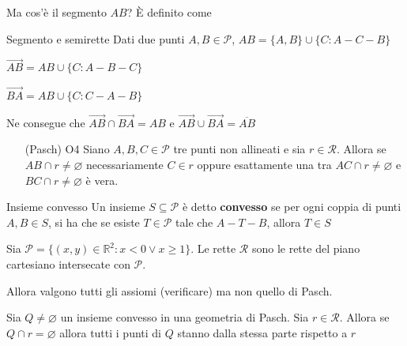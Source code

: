 Ma cos'è il segmento \(AB\)? È definito come 
\begin{definition}{Segmento e semirette}
    Dati due punti \(A, B \in \mathcal{P}\), 
    \(AB = \{A, B\} \cup \{C : A - C - B\} \)  

    \(\vec{AB} = AB \cup \{C : A - B - C\} \) 

    \(\vec{BA} = AB \cup \{C : C - A - B\} \) 
\end{definition}

Ne consegue che \(\vec{AB} \cap \vec{BA} = AB\) e \(\vec{AB} \cup \vec{BA} =
\overline{AB}\) 
\begin{enumerate}
    \item[(Pasch) O4] Siano \(A, B, C \in \mathcal{P}\) tre punti non allineati
        e sia \(r \in \mathcal{R}\). Allora se \(AB \cap r \neq \varnothing\)
        necessariamente \(C \in r\) oppure esattamente una tra  \(AC \cap r \neq
        \varnothing\) e \(BC \cap r \neq \varnothing\) è vera.
\end{enumerate}



\begin{definition}{Insieme convesso}
    Un insieme \(S \subseteq \mathcal{P}\) è detto \textbf{convesso} se per ogni
    coppia di punti \(A, B \in S\), si ha che se esiste \(T \in \mathcal{P}\)
    tale che \(A - T - B\), allora \(T \in S\) 
\end{definition}

\begin{example}
    Sia \(\mathcal{P} = \{{(x,y)} \in \mathbb{R}^2 : x < 0 \lor x \ge 1\} \). Le
    rette \(\mathcal{R}\) sono le rette del piano cartesiano intersecate con
    \(\mathcal{P}\). 

    Allora valgono tutti gli assiomi (verificare) ma non quello di Pasch. 
\end{example}

\begin{theorem}
    Sia \(Q \neq \varnothing\) un insieme convesso in una geometria di Pasch.
    Sia \(r \in \mathcal{R}\). Allora se \(Q \cap r = \varnothing\) allora tutti
    i punti di \(Q\) stanno dalla stessa parte rispetto a \(r\)
\end{theorem}






